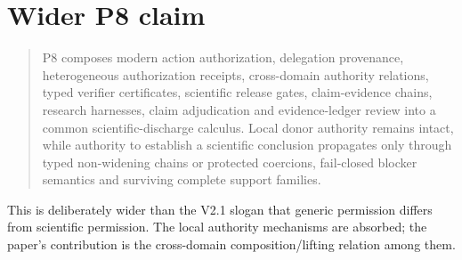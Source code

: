 \section{Wider P8 claim}

\begin{quote}
P8 composes modern action authorization, delegation provenance, heterogeneous authorization receipts, cross-domain authority relations, typed verifier certificates, scientific release gates, claim-evidence chains, research harnesses, claim adjudication and evidence-ledger review into a common scientific-discharge calculus. Local donor authority remains intact, while authority to establish a scientific conclusion propagates only through typed non-widening chains or protected coercions, fail-closed blocker semantics and surviving complete support families.
\end{quote}

This is deliberately wider than the V2.1 slogan that generic permission differs from scientific permission. The local authority mechanisms are absorbed; the paper's contribution is the cross-domain composition/lifting relation among them.
